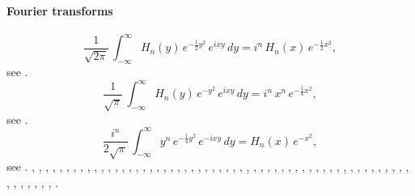 \documentclass[envcountchap,graybox]{svmono}
\newcommand\half{\frac12}
\newcommand\iy\infty
\begin{document}
\paragraph{Fourier transforms}
\begin{equation}
\frac1{\sqrt{2\pi}}\,\int_{-\iy}^\iy H_n(y)\,e^{-\half y^2}\,e^{ixy}\,dy=
i^n\,H_n(x)\,e^{-\half x^2},
\label{15}
\end{equation}
see .
\begin{equation}
\frac1{\sqrt\pi}\,\int_{-\iy}^\iy H_n(y)\,e^{-y^2}\,e^{ixy}\,dy=
i^n\,x^n\,e^{-\frac14 x^2},
\label{16}
\end{equation}
see .
\begin{equation}
\frac{i^n}{2\sqrt\pi}\,\int_{-\iy}^\iy y^n\,e^{-\frac14 y^2}\,e^{-ixy}\,dy=
H_n(x)\,e^{-x^2},
\label{17}
\end{equation}
see .
%
\cite{Abram}, \cite{NAlSalam66}, \cite{AlSalam90}, \cite{AlSalamChihara72},
\cite{AlSalamChihara76}, \cite{AndrewsAskey85}, \cite{AndrewsAskeyRoy}, \cite{Area+I}, 
\cite{Askey68}, \cite{Askey75}, \cite{Askey89I}, \cite{AskeyGasper76}, \cite{AskeyWilson85}, 
\cite{Azor}, \cite{Berg}, \cite{BilodeauII}, \cite{Brafman51}, \cite{Brafman57II}, 
\cite{Brenke}, \cite{CarlitzSrivastava}, \cite{ChenSrivastava}, \cite{Chihara78}, 
\cite{Cohen}, \cite{Danese}, \cite{DetteStudden92}, \cite{DetteStudden95}, \cite{Doha2004I},
\cite{Erdelyi+}, \cite{Faldey}, \cite{Gawronski87}, \cite{Gawronski93}, \cite{Gillis+},
\cite{Godoy+}, \cite{Grad}, \cite{Ismail74}, \cite{Ismail2005II}, \cite{IsmailStanton97},
\cite{Koekoek2000}, \cite{Koorn88}, \cite{Krasikov2004}, \cite{Kwon+}, \cite{LabelleYehIII},
\cite{Lesky95II}, \cite{Lesky96}, \cite{LewanowiczI}, \cite{LopezTemme99}, \cite{Mathai},
\cite{Meixner}, \cite{Nikiforov+}, \cite{NikiforovUvarov}, \cite{Olver}, \cite{Pittaluga},
\cite{Rainville}, \cite{SainteViennot}, \cite{Srivastava71}, \cite{SrivastavaMathur},
\cite{Szego75}, \cite{Temme}, \cite{TemmeLopez2000}, \cite{Trickovic}, \cite{Viennot},
\cite{Weisner59}, \cite{Wyman}.
\end{document}
